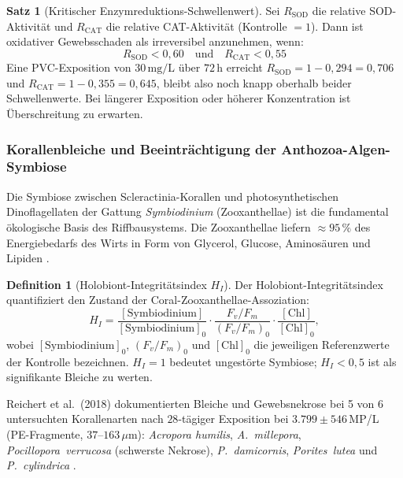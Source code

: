 ﻿\documentclass[12pt,a4paper]{article}
\theoremstyle{definition}
\newtheorem{definition}{Definition}[section]
\newtheorem{satz}{Satz}
\theoremstyle{remark}
\begin{document}
\begin{satz}[Kritischer Enzymreduktions-Schwellenwert]
Sei $R_{\text{SOD}}$ die relative SOD-Aktivit\"at und $R_{\text{CAT}}$ die relative
CAT-Aktivit\"at (Kontrolle $= 1$). Dann ist oxidativer Gewebsschaden als irreversibel
anzunehmen, wenn:
\begin{equation}
  R_{\text{SOD}} < 0{,}60 \quad \text{und} \quad R_{\text{CAT}} < 0{,}55
  \label{eq:threshold_enzym}
\end{equation}
Eine PVC-Exposition von $30\,\text{mg/L}$ \"uber $72\,\text{h}$ erreicht
$R_{\text{SOD}} = 1 - 0{,}294 = 0{,}706$ und
$R_{\text{CAT}} = 1 - 0{,}355 = 0{,}645$, bleibt also noch knapp oberhalb beider
Schwellenwerte. Bei l\"angerer Exposition oder h\"oherer Konzentration ist
\"Uberschreitung zu erwarten.
\end{satz}

\subsubsection{Korallenbleiche und Beeintr\"achtigung der Anthozoa-Algen-Symbiose}

Die Symbiose zwischen Scleractinia-Korallen und photosynthetischen Dinoflagellaten
der Gattung \textit{Symbiodinium} (Zooxanthellae) ist die fundamental
\"okologische Basis des Riffbausystems. Die Zooxanthellae liefern
${\approx}95\,\%$ des Energiebedarfs des Wirts in Form von Glycerol, Glucose,
Aminos\"auren und Lipiden \cite{muscatine1990role}.

\begin{definition}[Holobiont-Integrit\"atsindex $H_I$]
Der Holobiont-Integrit\"atsindex quantifiziert den Zustand der
Coral-Zooxanthellae-Assoziation:
\begin{equation}
  H_I = \frac{[\text{Symbiodinium}]}{[\text{Symbiodinium}]_0} \cdot
        \frac{F_v/F_m}{(F_v/F_m)_0} \cdot
        \frac{[\text{Chl}]}{[\text{Chl}]_0},
  \label{eq:holobiont_index}
\end{equation}
wobei $[\text{Symbiodinium}]_0$, $(F_v/F_m)_0$ und $[\text{Chl}]_0$ die jeweiligen
Referenzwerte der Kontrolle bezeichnen. $H_I = 1$ bedeutet ungestörte Symbiose;
$H_I < 0{,}5$ ist als signifikante Bleiche zu werten.
\end{definition}

Reichert et al.\ (2018) dokumentierten Bleiche und Gewebsnekrose bei
5 von 6 untersuchten Korallenarten nach $28$-t\"agiger Exposition
bei $3.799 \pm 546$\,MP/L (PE-Fragmente, $37$--$163\,\mu$m):
\textit{Acropora humilis}, \textit{A.~millepora}, \textit{Pocillopora~verrucosa}
(schwerste Nekrose), \textit{P.~damicornis}, \textit{Porites~lutea} und
\textit{P.~cylindrica} \cite{reichert2018responses}.
\end{document}
